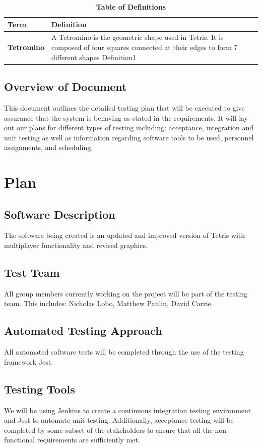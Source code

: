 \documentclass[12pt, titlepage]{article}
\begin{document}
	\begin{table}[!htbp]
		\caption{\textbf{Table of Definitions}} \label{Table of Definitions}
		
		\begin{tabularx}{\textwidth}{p{3cm}X}
			\toprule
			\textbf{Term} & \textbf{Definition}\\
			\midrule
			\textbf{Tetromino} & A Tetromino is the geometric shape used in Tetris. It is composed of four squares connected at their edges to form 7 different shapes Definition1\\
			\bottomrule
		\end{tabularx}
		
	\end{table}	
	
	\subsection{Overview of Document}
	This document outlines the detailed testing plan that will be executed to give assurance that the system is behaving as stated in the requirements. It will lay out our plans for different types of testing including: acceptance, integration and unit testing as well as information regarding software tools to be used, personnel assignments, and scheduling.
	
	\section{Plan}
	
	\subsection{Software Description}
	The software being created is an updated and improved version of Tetris with multiplayer functionality and revised graphics.
	
	\subsection{Test Team}
	All group members currently working on the project will be part of the testing team. This includes:  Nicholas Lobo, Matthew Paulin, David Carrie.
	\subsection{Automated Testing Approach}
	All automated software tests will be completed through the use of the testing framework Jest.
	\subsection{Testing Tools}
	We will be using Jenkins to create a continuous integration testing environment and Jest to automate unit testing. Additionally, acceptance testing will be completed by some subset of the stakeholders to ensure that all the non functional requirements are sufficiently met.
\end{document}
